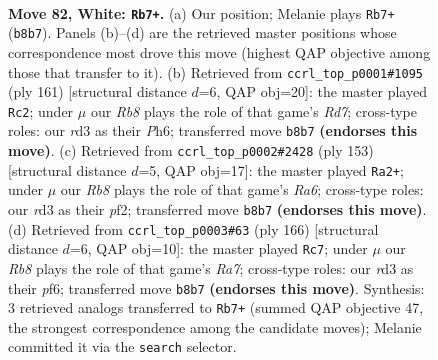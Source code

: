 \documentclass[11pt]{article}
\begin{document}
\clearpage

\begin{figure}[p]\centering
\begin{subfigure}{0.46\textwidth}\centering
\resizebox{\linewidth}{!}{%
\newchessgame
\chessboard[
  setfen={1R6/6k1/8/6K1/r6P/3r4/8/8 w - - 5 82},
  showmover=false,
  pgfstyle=straightmove, color=movearrow, markmove={b8-b7}
]}
\caption{}
\end{subfigure}\hfill
\begin{subfigure}{0.46\textwidth}\centering
\resizebox{\linewidth}{!}{%
\newchessgame
\chessboard[
  setfen={8/8/7p/8/6k1/R6p/3r4/7K b - - 3 81},
  showmover=false,
  pgfstyle=straightmove, color=movearrow, markmove={d2-c2}
]}
\caption{}
\end{subfigure}
\\[4pt]
\begin{subfigure}{0.46\textwidth}\centering
\resizebox{\linewidth}{!}{%
\newchessgame
\chessboard[
  setfen={8/8/2p4R/3k4/8/r7/2K2P2/8 b - - 4 77},
  showmover=false,
  pgfstyle=straightmove, color=movearrow, markmove={a3-a2}
]}
\caption{}
\end{subfigure}\hfill
\begin{subfigure}{0.46\textwidth}\centering
\resizebox{\linewidth}{!}{%
\newchessgame
\chessboard[
  setfen={8/R7/5p1k/8/3r2P1/5K2/8/8 w - - 63 84},
  showmover=false,
  pgfstyle=straightmove, color=movearrow, markmove={a7-c7}
]}
\caption{}
\end{subfigure}
\caption{\textbf{Move 82, White: \texttt{Rb7+}.} (a) Our position; Melanie plays \texttt{Rb7+} (\texttt{b8b7}). Panels (b)--(d) are the retrieved master positions whose correspondence most drove this move (highest QAP objective among those that transfer to it). (b) Retrieved from \texttt{ccrl\_top\_p0001\#1095} (ply 161) [structural distance $d$=6, QAP obj=20]: the master played \texttt{Rc2}; under $\mu$ our \emph{Rb8} plays the role of that game's \emph{Rd7}; cross-type roles: our \emph{r}d3 as their \emph{P}h6; transferred move \texttt{b8b7} \textbf{(endorses this move)}. (c) Retrieved from \texttt{ccrl\_top\_p0002\#2428} (ply 153) [structural distance $d$=5, QAP obj=17]: the master played \texttt{Ra2+}; under $\mu$ our \emph{Rb8} plays the role of that game's \emph{Ra6}; cross-type roles: our \emph{r}d3 as their \emph{p}f2; transferred move \texttt{b8b7} \textbf{(endorses this move)}. (d) Retrieved from \texttt{ccrl\_top\_p0003\#63} (ply 166) [structural distance $d$=6, QAP obj=10]: the master played \texttt{Rc7}; under $\mu$ our \emph{Rb8} plays the role of that game's \emph{Ra7}; cross-type roles: our \emph{r}d3 as their \emph{p}f6; transferred move \texttt{b8b7} \textbf{(endorses this move)}. Synthesis: 3 retrieved analogs transferred to \texttt{Rb7+} (summed QAP objective 47, the strongest correspondence among the candidate moves); Melanie committed it via the \texttt{search} selector.}
\label{fig:thought-m162}
\end{figure}
\end{document}
